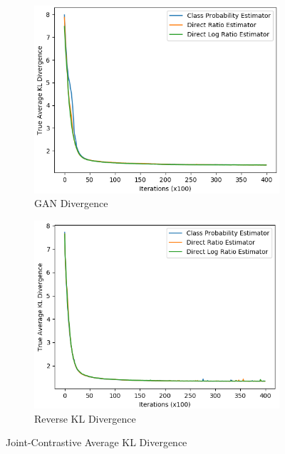 \documentclass[honours,12pt]{unswthesis}
\numberwithin{equation}{section}
\theoremstyle{definition}
\begin{document}
\begin{figure}
\begin{subfigure}{0.49\textwidth}
\includegraphics[width=\linewidth]{truklmins/JCADVvsJCADVexpvsJCADVgudlog.png}
\caption{GAN Divergence}
\end{subfigure}
\begin{subfigure}{0.49\textwidth}
\includegraphics[width=\linewidth]{truklmins/JCKLDvsJCKLexpvsJCKLgudlog.png}
\caption{Reverse KL Divergence}
\end{subfigure}
\caption{Joint-Contrastive Average KL Divergence}
\end{figure}
\end{document}
